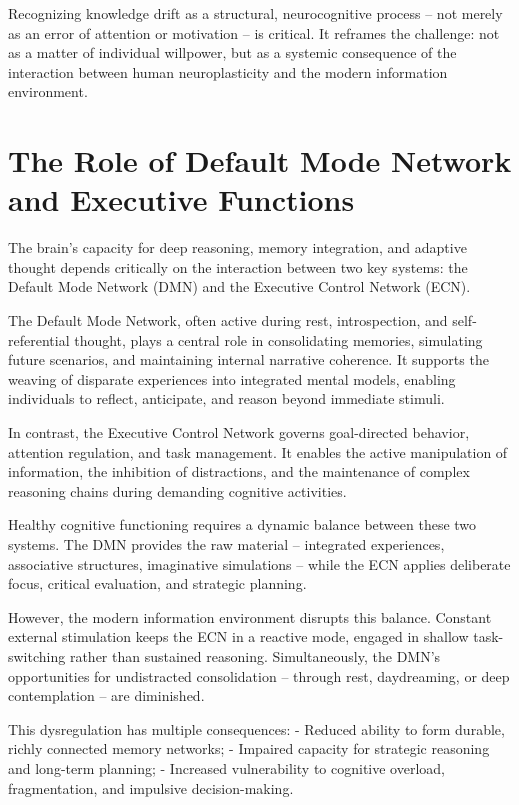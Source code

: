 Recognizing knowledge drift as a structural, neurocognitive process --
not merely as an error of attention or motivation -- is critical. It
reframes the challenge: not as a matter of individual willpower, but as
a systemic consequence of the interaction between human neuroplasticity
and the modern information environment.


\section{The Role of Default Mode Network and Executive Functions}

The brain's capacity for deep reasoning, memory integration, and
adaptive thought depends critically on the interaction between two key
systems: the Default Mode Network (DMN) and the Executive Control
Network (ECN).

The Default Mode Network, often active during rest, introspection, and
self-referential thought, plays a central role in consolidating
memories, simulating future scenarios, and maintaining internal
narrative coherence. It supports the weaving of disparate experiences
into integrated mental models, enabling individuals to reflect,
anticipate, and reason beyond immediate stimuli.

In contrast, the Executive Control Network governs goal-directed
behavior, attention regulation, and task management. It enables the
active manipulation of information, the inhibition of distractions, and
the maintenance of complex reasoning chains during demanding cognitive
activities.

Healthy cognitive functioning requires a dynamic balance between these
two systems. The DMN provides the raw material -- integrated experiences,
associative structures, imaginative simulations -- while the ECN applies
deliberate focus, critical evaluation, and strategic planning.

However, the modern information environment disrupts this balance.
Constant external stimulation keeps the ECN in a reactive mode, engaged
in shallow task-switching rather than sustained reasoning.
Simultaneously, the DMN's opportunities for undistracted consolidation --
through rest, daydreaming, or deep contemplation -- are diminished.

This dysregulation has multiple consequences: - Reduced ability to form
durable, richly connected memory networks; - Impaired capacity for
strategic reasoning and long-term planning; - Increased vulnerability to
cognitive overload, fragmentation, and impulsive decision-making.

